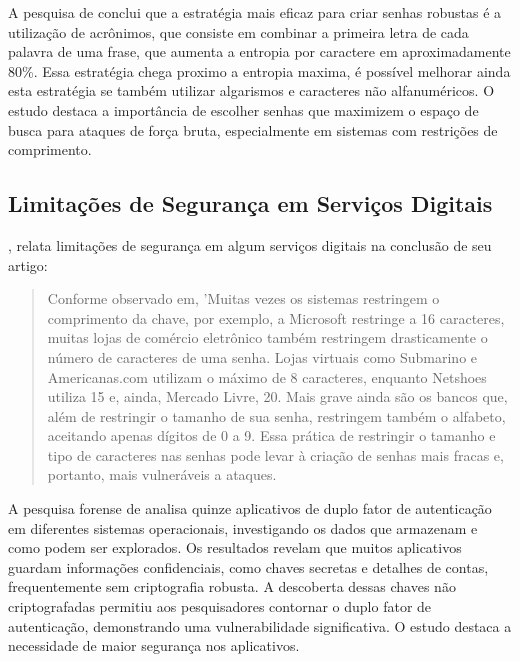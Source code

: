 \documentclass[12pt]{article}
\begin{document}
A pesquisa de \cite{article:1} conclui que a estratégia mais eficaz para criar senhas
robustas é a utilização de acrônimos, que consiste em combinar a primeira letra de
cada palavra de uma frase, que aumenta a entropia por caractere em aproximadamente 80\%.
Essa estratégia chega proximo a entropia maxima, é possível melhorar ainda esta
estratégia se também utilizar algarismos e caracteres não alfanuméricos.
O estudo destaca a importância de escolher senhas que maximizem o espaço
de busca para ataques de força bruta, especialmente em sistemas com
restrições de comprimento.

\subsection{Limitações de Segurança em Serviços Digitais}

\cite{article:1}, relata limitações de segurança em algum serviços
digitais na conclusão de seu artigo:

\begin{adjustwidth}{4cm}{0cm}
  \begin{quote}
    \small
    \linespread{1.0}
    \selectfont
    Conforme observado em, 'Muitas vezes os sistemas restringem o comprimento da chave, por exemplo, a
    Microsoft restringe a 16 caracteres, muitas lojas de comércio eletrônico também restringem drasticamente o
    número de caracteres de uma senha. Lojas virtuais como Submarino e Americanas.com utilizam o máximo de 8
    caracteres, enquanto Netshoes utiliza 15 e, ainda, Mercado Livre, 20. Mais grave ainda são os bancos que,
    além de restringir o tamanho de sua senha, restringem também o alfabeto, aceitando apenas dígitos de 0 a 9.
    Essa prática de restringir o tamanho e tipo de caracteres nas senhas pode levar à criação de senhas mais
    fracas e, portanto, mais vulneráveis a ataques.
    \cite{article:1}
  \end{quote}
\end{adjustwidth}

A pesquisa forense de \cite{article:2} analisa quinze aplicativos de duplo fator de
autenticação em diferentes sistemas operacionais, investigando os dados que armazenam
e como podem ser explorados.
Os resultados revelam que muitos aplicativos guardam informações confidenciais, como
chaves secretas e detalhes de contas, frequentemente sem criptografia robusta.
A descoberta dessas chaves não criptografadas permitiu aos pesquisadores contornar o 
duplo fator de autenticação, demonstrando uma vulnerabilidade significativa.
O estudo destaca a necessidade de maior segurança nos aplicativos.
\end{document}
